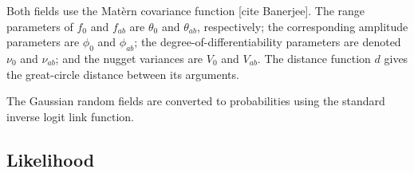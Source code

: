 \documentclass[a4paper]{article}
\begin{document}
Both fields use the Mat\`ern covariance function [cite Banerjee]. The range parameters of $f_0$ and $f_{ab}$ are $\theta_0$ and $\theta_{ab}$, respectively; the corresponding amplitude parameters are $\phi_0$ and $\phi_{ab}$; the degree-of-differentiability parameters are denoted $\nu_{0}$ and $\nu_{ab}$; and the nugget variances are $V_0$ and $V_{ab}$. The distance function $d$ gives the great-circle distance between its arguments.

The Gaussian random fields are converted to probabilities using the standard inverse logit link function.

\subsection{Likelihood} %
\label{sec:likelihood}
\end{document}
